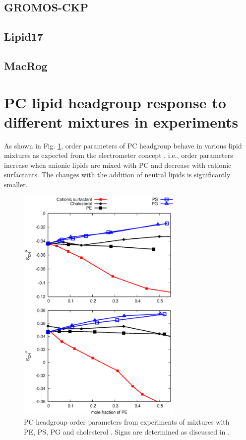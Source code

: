 \documentclass[aps,prl,superscriptaddress,twocolumn]{revtex4}
\begin{document}
\subsection{GROMOS-CKP}

\subsection{Lipid17}

\subsection{MacRog}

\section{PC lipid headgroup response to different mixtures in experiments}
As shown in Fig. \ref{HGorderparametersPCvsPEPSPGchol}, order parameters of PC
headgroup behave in various lipid mixtures as expected from the electrometer concept \cite{seelig87, scherer87},
i.e., order parameters increase when anionic lipids are mixed with PC and decrease with cationic
surfactants. The changes with the addition of neutral lipids is significantly smaller.
\begin{figure}[]
  \centering
  \includegraphics[width=8.0cm]{../Figs/HGorderparametersPCvsPEPSPGchol.eps}
  \caption{\label{HGorderparametersPCvsPEPSPGchol}
    PC headgroup order parameters from experiments of mixtures with
    PE, PS, PG and cholesterol \cite{scherer87,scherer89,ferreira13}.
    Signs are determined as discussed in \cite{botan15,ollila16}.
  }
\end{figure}
\end{document}
